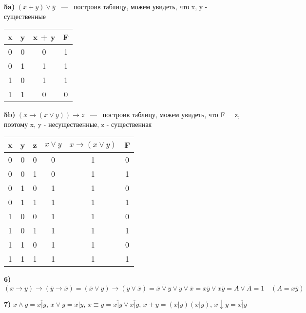 \documentclass[12pt,a4paper,fleqn]{article}
\begin{document}
{\bf 5a)} $(x + y) \lor \overline{y}$ ~---~  построив таблицу, можем увидеть, что x, y - существенные \newline 

\begin{tabular}{| c | c | c | c |}
\hline
x & y & x + y & F \\ \hline
0 & 0 & 0 & 1\\
0 & 1 & 1 & 1\\
1 & 0 & 1 & 1\\
1 & 1 & 0 & 0\\
\hline
\end{tabular} \newline

{\bf 5b)} $(x \rightarrow (x \lor y)) \rightarrow z$ ~---~  построив таблицу, можем увидеть, что F = z, поэтому x, y - несущественные, z - существенная\newline

\begin{tabular}{| c | c | c | c | c | c |}
\hline
x & y & z & $x \lor y$ & $x \rightarrow (x \lor y)$ & F \\ \hline
0 & 0 & 0 & 0 & 1 & 0 \\
0 & 0 & 1 & 0 & 1 & 1 \\
0 & 1 & 0 & 1 & 1 & 0 \\
0 & 1 & 1 & 1 & 1 & 1 \\
1 & 0 & 0 & 1 & 1 & 0 \\
1 & 0 & 1 & 1 & 1 & 1 \\
1 & 1 & 0 & 1 & 1 & 0 \\
1 & 1 & 1 & 1 & 1 & 1 \\
\hline
\end{tabular} \newline

{\bf 6)} $(x \rightarrow y) \rightarrow (\overline{y} \rightarrow \overline{x})= (\overline{x} \lor y) \rightarrow (y \lor \overline{x}) = \overline{\overline{x} \lor y} \lor y \lor \overline{x} = x\overline{y} \lor \overline{x\overline{y}} = A \lor \overline{A} = 1 \quad (A = x\overline{y})$ \newline

{\bf 7)} $x \land y = \overline{x | y}$, $x \lor y = \overline{x} | \overline{y}$, $x \equiv y = \overline{x | y} \lor \overline{\overline{x} | \overline{y}}$, $x + y = (x | y)(\overline{x} | \overline{y})$, $x \downarrow y = \overline{\overline{x} | \overline{y}}$
\end{document}

